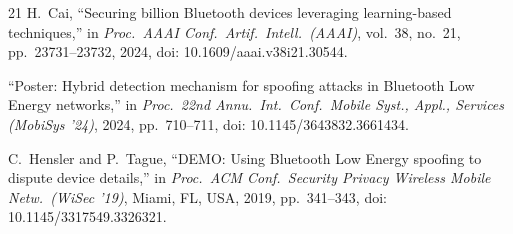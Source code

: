 \documentclass[journal,10pt]{IEEEtran}
\begin{document}
\begin{thebibliography}{21}
 H.~Cai, ``Securing billion Bluetooth devices leveraging
learning-based techniques,'' in \emph{Proc.\ AAAI Conf.\ Artif.\ Intell.\
(AAAI)}, vol.~38, no.~21, pp.~23731--23732, 2024, doi:
10.1609/aaai.v38i21.30544.

 ``Poster: Hybrid detection mechanism for spoofing
attacks in Bluetooth Low Energy networks,'' in \emph{Proc.\ 22nd Annu.\ Int.\
Conf.\ Mobile Syst., Appl., Services (MobiSys '24)}, 2024, pp.~710--711, doi:
10.1145/3643832.3661434.

 C.~Hensler and P.~Tague, ``DEMO: Using Bluetooth Low Energy
spoofing to dispute device details,'' in \emph{Proc.\ ACM Conf.\ Security
Privacy Wireless Mobile Netw.\ (WiSec '19)}, Miami, FL, USA, 2019, pp.~341--343,
doi: 10.1145/3317549.3326321.

\end{thebibliography}
\end{document}
